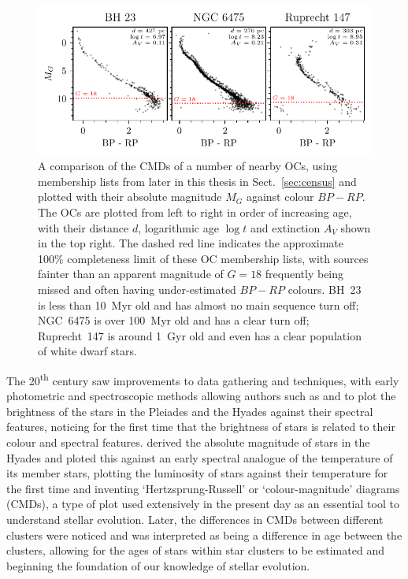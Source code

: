 \begin{figure}[tb]
	\includegraphics[width=\textwidth]{fig/c1/cmd_comparison.pdf}
	\caption[A comparison of the CMDs of a number of nearby OCs.]{A comparison of the CMDs of a number of nearby OCs, using membership lists from later in this thesis in Sect.~\ref{sec:census} and plotted with their absolute magnitude $M_G$ against colour $BP - RP$. The OCs are plotted from left to right in order of increasing age, with their distance $d$, logarithmic age $\log t$ and extinction $A_V$ shown in the top right. The dashed red line indicates the approximate 100\% completeness limit of these OC membership lists, with sources fainter than an apparent magnitude of $G=18$ frequently being missed and often having under-estimated $BP-RP$ colours. BH~23 is less than 10~Myr old and has almost no main sequence turn off; NGC~6475 is over 100~Myr old and has a clear turn off; Ruprecht~147 is around 1~Gyr old and even has a clear population of white dwarf stars.}
	\label{fig:intro:history:cmds}
\end{figure}

The 20\textsuperscript{th} century saw improvements to data gathering and techniques, with early photometric and spectroscopic methods allowing authors such as \cite{rosenberg_uber_zusammenhang_1910} and \cite{hertzsprung_ueber_verwendung_1911} to plot the brightness of the stars in the Pleiades and the Hyades against their spectral features, noticing for the first time that the brightness of stars is related to their colour and spectral features. \cite{russell_relations_spectra_1914} derived the absolute magnitude of stars in the Hyades and ploted this against an early spectral analogue of the temperature of its member stars, plotting the luminosity of stars against their temperature for the first time and inventing `Hertzsprung-Russell' or `colour-magnitude' diagrams (CMDs), a type of plot used extensively in the present day as an essential tool to understand stellar evolution. Later, the differences in CMDs between different clusters were noticed and was interpreted as being a difference in age between the clusters, allowing for the ages of stars within star clusters to be estimated and beginning the foundation of our knowledge of stellar evolution.

